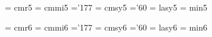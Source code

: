  \font\fivrm  = cmr5               %
 \font\fivmi  = cmmi5              %
    \skewchar\fivmi ='177          %
 \font\fivsy  = cmsy5              %
    \skewchar\fivsy ='60           %
 \font\fivly  = lasy5             %
\font\fivmin = min5		   %

 \font\sixrm  = cmr6               %
 \font\sixmi  = cmmi6              %
    \skewchar\sixmi ='177          %
 \font\sixsy  = cmsy6              %
    \skewchar\sixsy ='60           %
 \font\sixly  = lasy6             %
\font\sixmin = min6		   %

